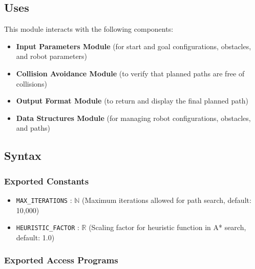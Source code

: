 \documentclass[12pt, titlepage]{article}
\begin{document}
\subsection{Uses}
This module interacts with the following components:
\begin{itemize}
\item \textbf{Input Parameters Module} (for start and goal configurations, obstacles, and robot parameters)
\item \textbf{Collision Avoidance Module} (to verify that planned paths are free of collisions)
\item \textbf{Output Format Module} (to return and display the final planned path)
\item \textbf{Data Structures Module} (for managing robot configurations, obstacles, and paths)
\end{itemize}


\subsection{Syntax}

\subsubsection{Exported Constants}

\begin{itemize}
  \item \texttt{MAX\_ITERATIONS} : $\mathbb{N}$ \quad (Maximum iterations allowed for path search, default: 10,000)
  \item \texttt{HEURISTIC\_FACTOR} : $\mathbb{R}$ \quad (Scaling factor for heuristic function in A* search, default: 1.0)
\end{itemize}


\subsubsection{Exported Access Programs}
\end{document}
